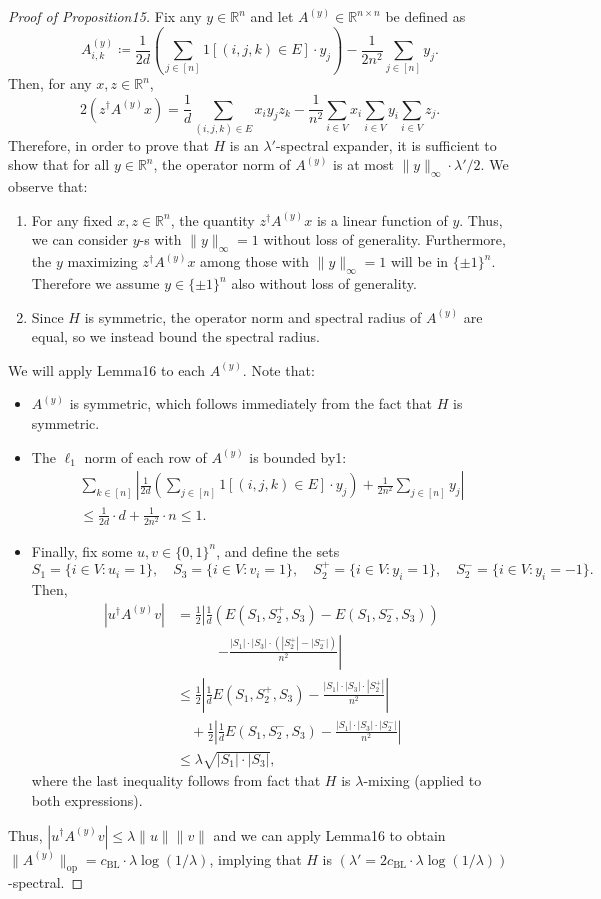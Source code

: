 \begin{proof}[Proof of Proposition15]
Fix any $y\in\mathbb R^n$ and let $A^{(y)}\in\mathbb R^{n\times n}$ be defined as
\[A^{(y)}_{i,k}\coloneqq\frac1{2d}\left(\sum_{j\in[n]}1[(i,j,k)\in E]\cdot y_j\right)-\frac1{2n^2}\sum_{j\in[n]}y_j.\]
Then, for any $x,z\in\mathbb R^n$,
\[2(z^{\dagger}A^{(y)}x)=\frac1d\sum_{(i,j,k)\in E}x_iy_jz_k-\frac1{n^2}\sum_{i\in V}x_i\sum_{i\in V}y_i\sum_{i\in V}z_j.\]
Therefore, in order to prove that $H$ is an $\lambda'$-spectral expander, it is sufficient to show that for all $y\in\mathbb R^n$, the operator norm of $A^{(y)}$ is at most $\|y\|_{\infty}\cdot\lambda'/2$. We observe that:
\begin{enumerate}
\item For any fixed $x,z\in\mathbb R^n$, the quantity $z^{\dagger}A^{(y)}x$ is a linear function of $y$. Thus, we can consider $y$-s with $\|y\|_{\infty}=1$ without loss of generality. Furthermore, the $y$ maximizing $z^{\dagger}A^{(y)}x$ among those with $\|y\|_{\infty}=1$ will be in $\{\pm1\}^n$. Therefore we assume $y\in\{\pm1\}^n$ also without loss of generality.
\item Since $H$ is symmetric, the operator norm and spectral radius of $A^{(y)}$ are equal, so we instead bound the spectral radius.
\end{enumerate}
We will apply Lemma16 to each $A^{(y)}$. Note that:
\begin{itemize}
\item $A^{(y)}$ is symmetric, which follows immediately from the fact that $H$ is symmetric.
\item The $\ell_1$ norm of each row of $A^{(y)}$ is bounded by1:
\begin{multline*}
\sum_{k\in[n]}\left|\frac1{2d}\left(\sum_{j\in[n]}1[(i,j,k)\in E]\cdot y_j\right)+\frac1{2n^2}\sum_{j\in[n]}y_j\right|\\
\leq\frac1{2d}\cdot d+\frac1{2n^2}\cdot n\leq1.
\end{multline*}
\item Finally, fix some $u,v\in\{0,1\}^n$, and define the sets
\[S_1=\{i\in V:u_i=1\},\quad S_3=\{i\in V:v_i=1\},\quad S_2^+=\{i\in V:y_i=1\},\quad S_2^-=\{i\in V:y_i=-1\}.\]
Then,
\begin{align*}
|u^{\dagger}A^{(y)}v|&=\frac12\left|\frac1d(E(S_1,S_2^+,S_3)-E(S_1,S_2^-,S_3))\right.\\
&\hspace{3em}\left.-\frac{|S_1|\cdot|S_3|\cdot(|S_2^+|-|S_2^-|)}{n^2}\right|\\
&\leq\frac12\left|\frac1dE(S_1,S_2^+,S_3)-\frac{|S_1|\cdot|S_3|\cdot|S_2^+|}{n^2}\right|\\
&\quad+\frac12\left|\frac1dE(S_1,S_2^-,S_3)-\frac{|S_1|\cdot|S_3|\cdot|S_2^-|}{n^2}\right|\\
&\leq\lambda\sqrt{|S_1|\cdot|S_3|},
\end{align*}
where the last inequality follows from fact that $H$ is $\lambda$-mixing (applied to both expressions).
\end{itemize}
Thus, $|u^{\dagger}A^{(y)}v|\leq\lambda\|u\|\|v\|$ and we can apply Lemma16 to obtain $\|A^{(y)}\|_{\mathrm{op}}=c_{\mathrm{BL}}\cdot\lambda\log(1/\lambda)$, implying that $H$ is $(\lambda'=2c_{\mathrm{BL}}\cdot\lambda\log(1/\lambda))$-spectral.
\end{proof}
